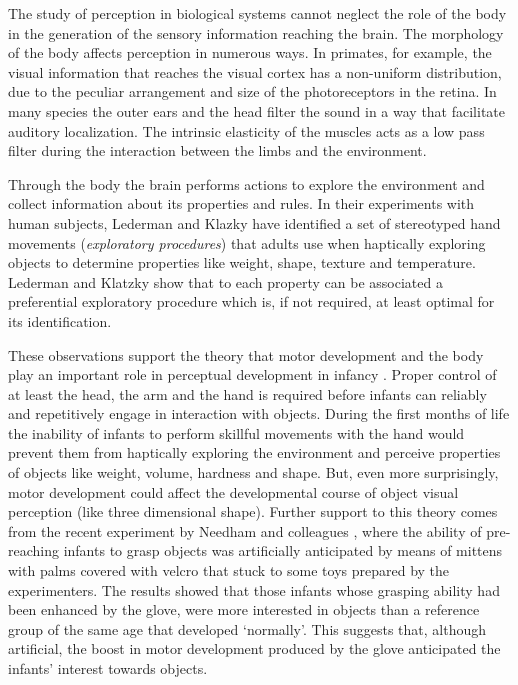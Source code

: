 
The study of perception in biological systems cannot neglect the role
of the body in the generation of the sensory information reaching the
brain.  The morphology of the body affects perception in numerous
ways. In primates, for example, the visual information that reaches
the visual cortex has a non-uniform distribution, due to the peculiar
arrangement and size of the photoreceptors in the retina. In many
species the outer ears and the head filter the sound in a way that
facilitate auditory localization. The intrinsic elasticity of the
muscles acts as a low pass filter during the interaction between the
limbs and the environment.

Through the body the brain performs actions to explore the environment
and collect information about its properties and rules. In their
experiments with human subjects, Lederman and Klazky
\cite{lederman87hand} have identified a set of stereotyped hand
movements ({\it exploratory procedures}) that adults use when
haptically exploring objects to determine properties like weight,
shape, texture and temperature. Lederman and Klatzky show that to each
property can be associated a preferential exploratory procedure which
is, if not required, at least optimal for its identification.


These observations support the theory that motor development and the
body play an important role in perceptual development in infancy
\cite{bushnell93motor}. Proper control of at least the head, the arm
and the hand is required before infants can reliably and repetitively
engage in interaction with objects. During the first months of life
the inability of infants to perform skillful movements with the hand
would prevent them from haptically exploring the environment and
perceive properties of objects like weight, volume, hardness and
shape. But, even more surprisingly, motor development could affect the
developmental course of object visual perception (like three
dimensional shape).
%
Further support to this theory comes from the recent experiment by
Needham and colleagues \cite{Needham02apick-me-up}, where the ability
of pre-reaching infants to grasp objects was artificially anticipated
by means of mittens with palms covered with velcro that stuck to some
toys prepared by the experimenters. The results showed that those
infants whose grasping ability had been enhanced by the glove, were
more interested in objects than a reference group of the same age that
developed `normally'. This suggests that, although artificial, the
boost in motor development produced by the glove anticipated the
infants' interest towards objects.

